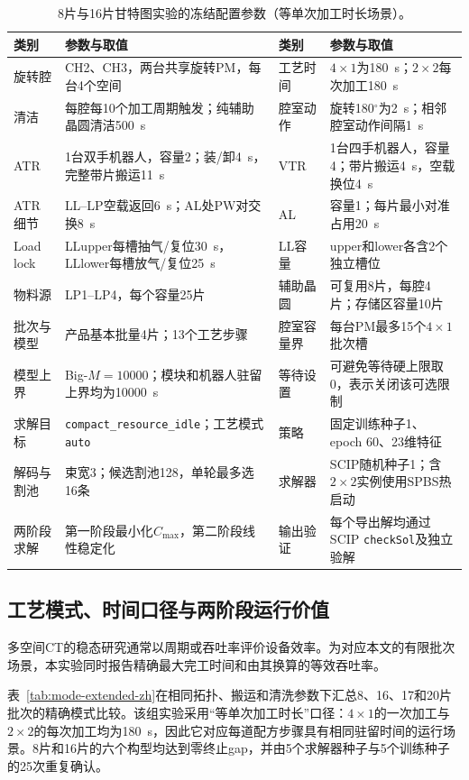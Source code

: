 \documentclass[final,5p,times,twocolumn]{elsarticle}
\begin{document}
\begin{table}[!htbp]
\centering
\scriptsize
\caption{8片与16片甘特图实验的冻结配置参数（等单次加工时长场景）。}
\label{tab:gantt-config-zh}
\begin{tabular}{p{} p{} p{} p{}}
\toprule
类别 & 参数与取值 & 类别 & 参数与取值\\
\midrule
旋转腔 & CH2、CH3，两台共享旋转PM，每台4个空间 & 工艺时间 & $4\times1$为180~s；$2\times2$每次加工180~s\\
清洁 & 每腔每10个加工周期触发；纯辅助晶圆清洁500~s & 腔室动作 & 旋转180$^\circ$为2~s；相邻腔室动作间隔1~s\\
ATR & 1台双手机器人，容量2；装/卸4~s，完整带片搬运11~s & VTR & 1台四手机器人，容量4；带片搬运4~s，空载换位4~s\\
ATR细节 & LL--LP空载返回6~s；AL处PW对交换8~s & AL & 容量1；每片最小对准占用20~s\\
Load lock & LLupper每槽抽气/复位30~s，LLlower每槽放气/复位25~s & LL容量 & upper和lower各含2个独立槽位\\
物料源 & LP1--LP4，每个容量25片 & 辅助晶圆 & 可复用8片，每腔4片；存储区容量10片\\
批次与模型 & 产品基本批量4片；13个工艺步骤 & 腔室容量界 & 每台PM最多15个$4\times1$批次槽\\
模型上界 & Big-$M=10000$；模块和机器人驻留上界均为10000~s & 等待设置 & 可避免等待硬上限取0，表示关闭该可选限制\\
求解目标 & \texttt{compact\_resource\_idle}；工艺模式\texttt{auto} & 策略 & 固定训练种子1、epoch 60、23维特征\\
解码与割池 & 束宽3；候选割池128，单轮最多选16条 & 求解器 & SCIP随机种子1；含$2\times2$实例使用SPBS热启动\\
两阶段求解 & 第一阶段最小化$C_{\max}$，第二阶段线性稳定化 & 输出验证 & 每个导出解均通过SCIP \texttt{checkSol}及独立验解\\
\bottomrule
\end{tabular}
\end{table}

\subsection{工艺模式、时间口径与两阶段运行价值}

多空间CT的稳态研究通常以周期或吞吐率评价设备效率\citep{gu2024multifinger}。为对应本文的有限批次场景，本实验同时报告精确最大完工时间和由其换算的等效吞吐率。

表~\ref{tab:mode-extended-zh}在相同拓扑、搬运和清洗参数下汇总8、16、17和20片批次的精确模式比较。该组实验采用“等单次加工时长”口径：$4\times1$的一次加工与$2\times2$的每次加工均为180~s，因此它对应每道配方步骤具有相同驻留时间的运行场景。8片和16片的六个构型均达到零终止gap，并由5个求解器种子与5个训练种子的25次重复确认。
\end{document}
